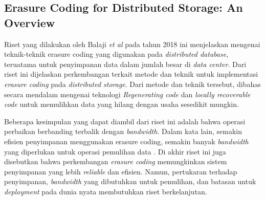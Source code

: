 \subsection{Erasure Coding for Distributed Storage: An Overview}

Riset yang dilakukan oleh Balaji \textit{et al} pada tahun 2018 ini menjelaskan mengenai teknik-teknik erasure coding yang digunakan pada \textit{distributed database}, teruatama untuk penyimpanan data dalam jumlah besar di \textit{data center}. Dari riset ini dijelaskan perkembangan terkait metode dan teknik untuk implementasi \textit{erasure coding} pada \textit{distributed storage}. Dari metode dan teknik tersebut, dibahas secara mendalam mengenai teknologi \textit{Regenerating code} dan \textit{locally recoverable code} untuk memulihkan data yang hilang dengan usaha sesedikit mungkin.

Beberapa kesimpulan yang dapat diambil dari riset ini adalah bahwa operasi perbaikan berbanding terbalik dengan \textit{bandwidth}. Dalam kata lain, semakin efisien penyimpanan menggunakan erasure coding, semakin banyak \textit{bandwidth} yang diperlukan untuk operasi pemulihan data \parencite{balaji2018erasure}. Di akhir riset ini juga disebutkan bahwa perkembangan \textit{erasure coding} memungkinkan sistem penyimpanan yang lebih \textit{reliable} dan efisien. Namun, pertukaran terhadap penyimpanan, \textit{bandwidth} yang dibutuhkan untuk pemulihan, dan batasan untuk \textit{deployment} pada dunia nyata membutuhkan riset berkelanjutan. 
